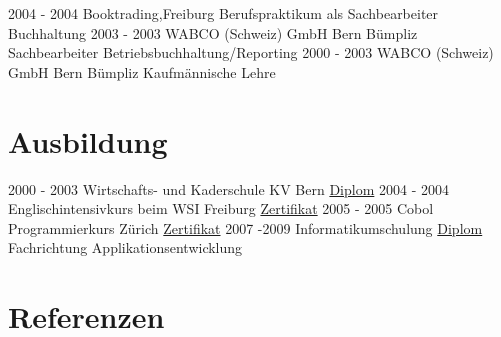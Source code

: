 \documentclass[letterpaper]{twentysecondcv} %
\begin{document}
\begin{twenty}
	\twentyitem
    	{2004 - 2004}
	{}
        {Booktrading,\textnormal{Freiburg}}
        {\href{http://www.uoguelph.ca/}{\color{pblue}{Arbeitszeugnis}}}
        {Berufspraktikum als Sachbearbeiter Buchhaltung}
	{}
	\twentyitem
    	{2003 - 2003}
	{}
        {WABCO (Schweiz) GmbH \textnormal{Bern Bümpliz}}
        {\href{http://www.uoguelph.ca/}{\color{pblue}{Arbeitszeugnis}}}
        {Sachbearbeiter Betriebsbuchhaltung/Reporting}
	{}
	\twentyitem
    	{2000 - 2003}
	{}
        {WABCO (Schweiz) GmbH \textnormal{Bern Bümpliz}}
        {\href{http://www.uoguelph.ca/}{\color{pblue}{Arbeitszeugnis}}}
        {Kaufmännische Lehre}
	{}
\end{twenty}
\section{Ausbildung}

\begin{twenty} %
	\twentyitem
    	{2000 - 2003}
        {}
        {Wirtschafts- und Kaderschule \textnormal{KV Bern}}
        {\hyperref[sec:hello]{Diplom}}
        {}
        {}
	\twentyitem
    	{2004 - 2004}
		{}
        {Englischintensivkurs beim WSI \textnormal{Freiburg}}
        {\hyperref[sec:hello]{Zertifikat}}
        {}
        {}
\twentyitem
    	{2005 - 2005}
		{}
        {Cobol Programmierkurs \textnormal{Zürich}}
        {\hyperref[sec:hello]{Zertifikat}}
        {}
        {}
\twentyitem
    	{2007 -2009}
		{}
        {Informatikumschulung}
        {\hyperref[sec:hello]{Diplom}}
        {Fachrichtung Applikationsentwicklung}
        {}
\end{twenty}

\section{Referenzen}
\end{document}
